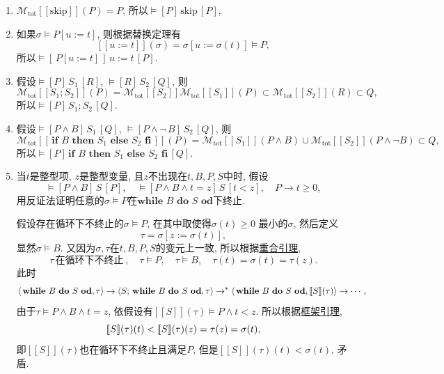 \documentclass[UTF8]{ctexart}
\begin{document}
\begin{enumerate}
    \item $\mathcal{M}_{\mathrm{tot}}[\![\mathrm{skip}]\!](P)=P$,
    所以$\models[P]\,\mathrm{skip}\,[P]$,

    \item 如果$\sigma\models P[u:=t]$, 则根据替换定理有
    \[
        [\![u:=t]\!](\sigma)=\sigma[u:=\sigma(t)]\models P,
    \]
    所以$\models[\,P[u:=t]\,]\,u:=t\,[P]$.

    \item 假设$\models[P]\,S_1\,[R]$, $\models[R]\,S_2\,[Q]$, 则
    \[
        \mathcal{M}_{\mathrm{tot}}[\![S_1;S_2]\!](P)=
        \mathcal{M}_{\mathrm{tot}}[\![S_2]\!]
        \mathcal{M}_{\mathrm{tot}}[\![S_1]\!](P)\subset
        \mathcal{M}_{\mathrm{tot}}[\![S_2]\!](R)\subset Q,
    \]
    所以$\models[P]\,S_1;S_2\,[Q]$.

    \item 假设$\models[P\land B]\,S_1\,[Q]$,
    $\models[P\land\neg\,B]\,S_2\,[Q]$, 则
    \[
        \mathcal{M}_{\mathrm{tot}}[\![\,\mathbf{if}\,\,B\,\,\mathbf{then}\,\,S_1\,\,
        \mathbf{else}\,\,S_2\,\,\mathbf{fi}\,]\!](P)=
        \mathcal{M}_{\mathrm{tot}}[\![S_1]\!](P\land B)\cup
        \mathcal{M}_{\mathrm{tot}}[\![S_2]\!](P\land\neg B)\subset Q,
    \]
    所以$\models[P]\,\mathbf{if}\,\,B\,\,\mathbf{then}\,\,S_1\,\,
    \mathbf{else}\,\,S_2\,\,\mathbf{fi}\,[Q]$.

    \item 当$t$是整型项, $z$是整型变量, 且$z$不出现在$t,B,P,S$中时, 假设
    \[
        \models[P\land B]\,S\,[P],\quad
        \models[P\land B\land t=z]\,S\,[t<z],\quad
        P\to t\geqslant 0,
    \]
    用反证法证明任意的$\sigma\models P$在$\mathbf{while}\,\,B\,\,
    \mathbf{do}\,\,S\,\,\mathbf{od}$下终止.

    \hspace{2.17em}
    假设存在循环下不终止的$\sigma\models P$, 在其中取使得$\sigma(t)\geqslant 0$
    最小的$\sigma$, 然后定义
    \[
        \tau=\sigma[z:=\sigma(t)],
    \]
    显然$\sigma\models B$. 又因为$\sigma,\tau$在$t,B,P,S$的变元上一致,
    所以根据\href{03 操作语义#nameddest=sec:定理2.2}{重合引理},
    \[
        \tau\,\text{在循环下不终止}\,,\quad \tau\models P,\quad\tau\models B,\quad
        \tau(t)=\sigma(t)=\tau(z).
    \]
    此时
    \[
        \langle\,\mathbf{while}\,\,B\,\,\mathbf{do}\,\,S\,\,
        \mathbf{od},\tau\rangle\to\langle S;\,\mathbf{while}\,\,B
        \,\,\mathbf{do}\,\,S\,\,\mathbf{od},\tau\rangle\to^*
        \langle\,\mathbf{while}\,\,B\,\,\mathbf{do}\,\,S\,\,
        \mathbf{od},[\![S]\!](\tau)\rangle\to\cdots,\\[-1pt]
    \]
    由于$\tau\models P\land B\land t=z$,
    依假设有$[\![S]\!](\tau)\models P\land t<z$.
    所以根据\href{03 操作语义#nameddest=sec:定理2.1}{框架引理},
    \vspace{1pt}
    \[
        [\![S]\!](\tau)(t)<[\![S]\!](\tau)(z)=\tau(z)=\sigma(t),\\[1pt]
    \]
    即$[\![S]\!](\tau)$也在循环下不终止且满足$P$,
    但是$[\![S]\!](\tau)(t)<\sigma(t)$, 矛盾.


\end{enumerate}
\end{document}

